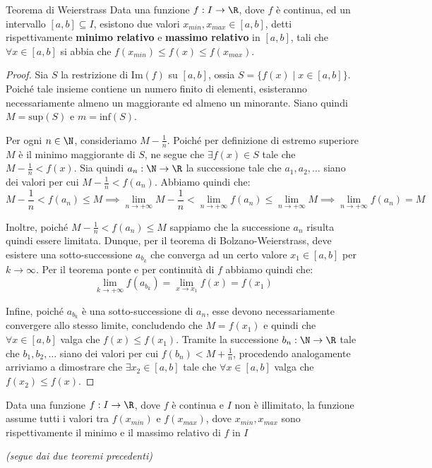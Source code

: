 \documentclass[a4paper, 12pt]{report}
\begin{document}
    \begin{framedthm}{Teorema di Weierstrass}
        Data una funzione $f : I \to \R$, dove $f$ è continua, ed un intervallo $[a,b] \subseteq I$, esistono due valori $x_{min}, x_{max} \in [a,b]$, detti rispettivamente \textbf{minimo relativo} e \textbf{massimo relativo} in $[a,b]$, tali che $\forall x \in [a,b]$ si abbia che $f(x_{min}) \leq f(x) \leq f(x_{max})$. 
    \end{framedthm}

    \begin{proof}
        Sia $S$ la restrizione di $\mathrm{Im}(f)$ su $[a,b]$, ossia $S = \{f(x) \mid x \in [a,b]\}$. Poiché tale insieme contiene un numero finito di elementi, esisteranno necessariamente almeno un maggiorante ed almeno un minorante. Siano quindi $M = \mathrm{sup}(S)$ e $m = \mathrm{inf}(S)$.
        
        Per ogni $n \in \N$, consideriamo $M - \frac{1}{n}$. Poiché per definizione di estremo superiore $M$ è il minimo maggiorante di $S$, ne segue che $\exists f(x) \in S$ tale che $M-\frac{1}{n} < f(x)$. Sia quindi $a_n : \N \to \R$ la successione tale che $a_1, a_2, \ldots$ siano dei valori per cui $M - \frac{1}{n} < f(a_n)$. Abbiamo quindi che:
        \[M-\frac{1}{n} < f(a_n) \leq M \implies \lim_{n \to +\infty} M-\frac{1}{n} < \lim_{n \to +\infty} f(a_n) \leq \lim_{n \to +\infty} M \implies \lim_{n \to +\infty} f(a_n) = M\]

        Inoltre, poiché $M-\frac{1}{n} < f(a_n) \leq M$ sappiamo che la successione $a_n$ risulta quindi essere limitata. Dunque, per il teorema di Bolzano-Weierstrass, deve esistere una sotto-successione $a_{b_k}$ che converga ad un certo valore $x_1 \in [a,b]$ per $k \to \infty$. Per il teorema ponte e per continuità di $f$ abbiamo quindi che:
        \[\lim_{k \to +\infty} f(a_{b_k}) = \lim_{x \to x_1} f(x) = f(x_1)\]
        
        Infine, poiché $a_{b_k}$ è una sotto-successione di $a_n$, esse devono necessariamente convergere allo stesso limite, concludendo che $M = f(x_1)$ e quindi che $\forall x \in [a,b]$ valga che $f(x) \leq f(x_1)$. Tramite la successione $b_n : \N \to \R$ tale che $b_1, b_2, \ldots$ siano dei valori per cui $f(b_n) < M + \frac{1}{n}$, procedendo analogamente arriviamo a dimostrare che $\exists x_2 \in [a,b]$ tale che $\forall x \in [a,b]$ valga che $f(x_2) \leq f(x)$.

    \end{proof}

    \begin{framedcor}{}
        Data una funzione $f : I \to \R$, dove $f$ è continua e $I$ non è illimitato, la funzione assume tutti i valori tra $f(x_{min})$ e $f(x_{max})$, dove $x_{min}, x_{max}$ sono rispettivamente il minimo e il massimo relativo di $f$ in $I$

        \textit{(segue dai due teoremi precedenti)}
    \end{framedcor}
\end{document}
